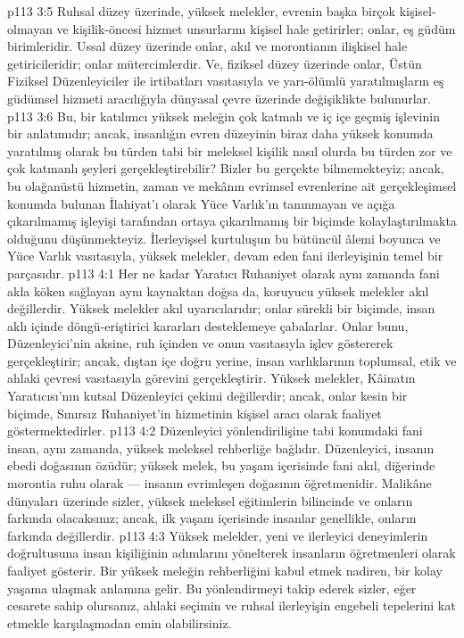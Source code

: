 \vs p113 3:5 Ruhsal düzey üzerinde, yüksek melekler, evrenin başka birçok kişisel\hyp{}olmayan ve kişilik\hyp{}öncesi hizmet unsurlarını kişisel hale getirirler; onlar, eş güdüm birimleridir. Ussal düzey üzerinde onlar, akıl ve morontianın ilişkisel hale getiricileridir; onlar mütercimlerdir. Ve, fiziksel düzey üzerinde onlar, Üstün Fiziksel Düzenleyiciler ile irtibatları vasıtasıyla ve yarı\hyp{}ölümlü yaratılmışların eş güdümsel hizmeti aracılığıyla dünyasal çevre üzerinde değişiklikte bulunurlar.
\vs p113 3:6 Bu, bir katılımcı yüksek meleğin çok katmalı ve iç içe geçmiş işlevinin bir anlatımıdır; ancak, insanlığın evren düzeyinin biraz daha yüksek konumda yaratılmış olarak bu türden tabi bir meleksel kişilik nasıl olurda bu türden zor ve çok katmanlı şeyleri gerçekleştirebilir? Bizler bu gerçekte bilmemekteyiz; ancak, bu olağanüstü hizmetin, zaman ve mekânın evrimsel evrenlerine ait gerçekleşimsel konumda bulunan İlahiyat’ı olarak Yüce Varlık’ın tanınmayan ve açığa çıkarılmamış işleyişi tarafından ortaya çıkarılmamış bir biçimde kolaylaştırılmakta olduğunu düşünmekteyiz. İlerleyişsel kurtuluşun bu bütüncül âlemi boyunca ve Yüce Varlık vasıtasıyla, yüksek melekler, devam eden fani ilerleyişinin temel bir parçasıdır.
\vs p113 4:1 Her ne kadar Yaratıcı Ruhaniyet olarak aynı zamanda fani akla köken sağlayan aynı kaynaktan doğsa da, koruyucu yüksek melekler akıl değillerdir. Yüksek melekler akıl uyarıcılarıdır; onlar sürekli bir biçimde, insan aklı içinde döngü\hyp{}eriştirici kararları desteklemeye çabalarlar. Onlar bunu, Düzenleyici’nin aksine, ruh içinden ve onun vasıtasıyla işlev göstererek gerçekleştirir; ancak, dıştan içe doğru yerine, insan varlıklarının toplumsal, etik ve ahlaki çevresi vasıtasıyla görevini gerçekleştirir. Yüksek melekler, Kâinatın Yaratıcısı’nın kutsal Düzenleyici çekimi değillerdir; ancak, onlar kesin bir biçimde, Sınırsız Ruhaniyet’in hizmetinin kişisel aracı olarak faaliyet göstermektedirler.
\vs p113 4:2 Düzenleyici yönlendirilişine tabi konumdaki fani insan, aynı zamanda, yüksek meleksel rehberliğe bağlıdır. Düzenleyici, insanın ebedi doğasının özüdür; yüksek melek, bu yaşam içerisinde fani akıl, diğerinde morontia ruhu olarak --- insanın evrimleşen doğasının öğretmenidir. Malikâne dünyaları üzerinde sizler, yüksek meleksel eğitimlerin bilincinde ve onların farkında olacaksınız; ancak, ilk yaşam içerisinde insanlar genellikle, onların farkında değillerdir.
\vs p113 4:3 Yüksek melekler, yeni ve ilerleyici deneyimlerin doğrultusuna insan kişiliğinin adımlarını yönelterek insanların öğretmenleri olarak faaliyet gösterir. Bir yüksek meleğin rehberliğini kabul etmek nadiren, bir kolay yaşama ulaşmak anlamına gelir. Bu yönlendirmeyi takip ederek sizler, eğer cesarete sahip olursanız, ahlaki seçimin ve ruhsal ilerleyişin engebeli tepelerini kat etmekle karşılaşmadan emin olabilirsiniz.
